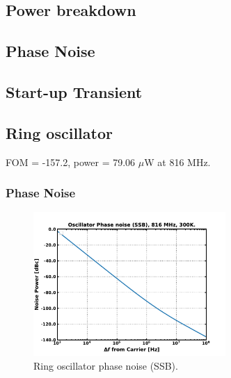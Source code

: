 \subsection{Power breakdown}

\subsection{Phase Noise}

\subsection{Start-up Transient}

\subsection{Ring oscillator}
	FOM = -157.2, power = 79.06 $\mu$W at 816 MHz. 
	\subsubsection{Phase Noise}
		\begin{figure}[htb!]
	        \centering
	        \includegraphics[width=0.65\textwidth, angle=0]{./figs/results/osc_pnoise}
		    \caption{Ring oscillator phase noise (SSB).}
		    \label{fig:ro_pnoise}
		\end{figure}
	\FloatBarrier


